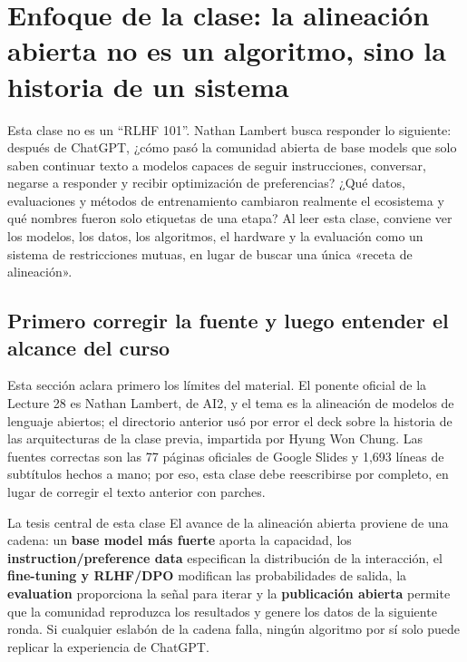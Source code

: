 \section{Enfoque de la clase: la alineación abierta no es un algoritmo, sino la historia de un sistema}

Esta clase no es un ``RLHF 101''. Nathan Lambert busca responder lo siguiente: después de ChatGPT, ¿cómo pasó la comunidad abierta de base models que solo saben continuar texto a modelos capaces de seguir instrucciones, conversar, negarse a responder y recibir optimización de preferencias? ¿Qué datos, evaluaciones y métodos de entrenamiento cambiaron realmente el ecosistema y qué nombres fueron solo etiquetas de una etapa? Al leer esta clase, conviene ver los modelos, los datos, los algoritmos, el hardware y la evaluación como un sistema de restricciones mutuas, en lugar de buscar una única «receta de alineación».

\subsection{Primero corregir la fuente y luego entender el alcance del curso}

Esta sección aclara primero los límites del material. El ponente oficial de la Lecture 28 es Nathan Lambert, de AI2, y el tema es la alineación de modelos de lenguaje abiertos; el directorio anterior usó por error el deck sobre la historia de las arquitecturas de la clase previa, impartida por Hyung Won Chung. Las fuentes correctas son las 77 páginas oficiales de Google Slides y 1,693 líneas de subtítulos hechos a mano; por eso, esta clase debe reescribirse por completo, en lugar de corregir el texto anterior con parches.


\begin{importantbox}{La tesis central de esta clase}
El avance de la alineación abierta proviene de una cadena: un \textbf{base model más fuerte} aporta la capacidad, los \textbf{instruction/preference data} especifican la distribución de la interacción, el \textbf{fine-tuning y RLHF/DPO} modifican las probabilidades de salida, la \textbf{evaluation} proporciona la señal para iterar y la \textbf{publicación abierta} permite que la comunidad reproduzca los resultados y genere los datos de la siguiente ronda. Si cualquier eslabón de la cadena falla, ningún algoritmo por sí solo puede replicar la experiencia de ChatGPT.
\end{importantbox}

